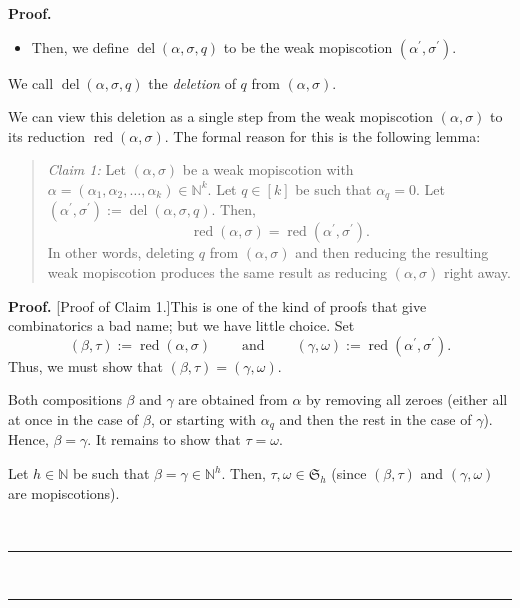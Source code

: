 \documentclass[numbers=enddot,12pt,final,onecolumn,notitlepage]{scrartcl}%
\theoremstyle{definition}
\newenvironment{statement}{\begin{quote}}{\end{quote}}
\newenvironment{fineprint}{\begin{small}}{\end{small}}
\newenvironment{proof}[1][Proof]{\noindent\textbf{#1.} }{\ \rule{0.5em}{0.5em}}
\newenvironment{noncompile}{}{}
\begin{document}
\begin{fineprint}
\begin{proof}
\begin{itemize}
\item Then, we define $\operatorname*{del}\left(  \alpha,\sigma,q\right)  $ to
be the weak mopiscotion $\left(  \alpha^{\prime},\sigma^{\prime}\right)  $.
\end{itemize}

We call $\operatorname*{del}\left(  \alpha,\sigma,q\right)  $ the
\emph{deletion} of $q$ from $\left(  \alpha,\sigma\right)  $.

We can view this deletion as a single step from the weak mopiscotion $\left(
\alpha,\sigma\right)  $ to its reduction $\operatorname*{red}\left(
\alpha,\sigma\right)  $. The formal reason for this is the following lemma:

\begin{statement}
\textit{Claim 1:} Let $\left(  \alpha,\sigma\right)  $ be a weak mopiscotion
with $\alpha=\left(  \alpha_{1},\alpha_{2},\ldots,\alpha_{k}\right)
\in\mathbb{N}^{k}$. Let $q\in\left[  k\right]  $ be such that $\alpha_{q}=0$.
Let $\left(  \alpha^{\prime},\sigma^{\prime}\right)  :=\operatorname*{del}%
\left(  \alpha,\sigma,q\right)  $. Then,%
\[
\operatorname*{red}\left(  \alpha,\sigma\right)  =\operatorname*{red}\left(
\alpha^{\prime},\sigma^{\prime}\right)  .
\]
In other words, deleting $q$ from $\left(  \alpha,\sigma\right)  $ and then
reducing the resulting weak mopiscotion produces the same result as reducing
$\left(  \alpha,\sigma\right)  $ right away.
\end{statement}

\begin{proof}
[Proof of Claim 1.]This is one of the kind of proofs that give combinatorics a
bad name; but we have little choice. Set
\[
\left(  \beta,\tau\right)  :=\operatorname*{red}\left(  \alpha,\sigma\right)
\ \ \ \ \ \ \ \ \ \ \text{and}\ \ \ \ \ \ \ \ \ \ \left(  \gamma
,\omega\right)  :=\operatorname*{red}\left(  \alpha^{\prime},\sigma^{\prime
}\right)  .
\]
Thus, we must show that $\left(  \beta,\tau\right)  =\left(  \gamma
,\omega\right)  $.

Both compositions $\beta$ and $\gamma$ are obtained from $\alpha$ by removing
all zeroes (either all at once in the case of $\beta$, or starting with
$\alpha_{q}$ and then the rest in the case of $\gamma$). Hence, $\beta=\gamma
$. It remains to show that $\tau=\omega$.

\begin{noncompile}
Let $h\in\mathbb{N}$ be such that $\beta=\gamma\in\mathbb{N}^{h}$. Then,
$\tau,\omega\in\mathfrak{S}_{h}$ (since $\left(  \beta,\tau\right)  $ and
$\left(  \gamma,\omega\right)  $ are mopiscotions).
\end{noncompile}


\end{proof}
\end{proof}
\end{fineprint}
\end{document}
